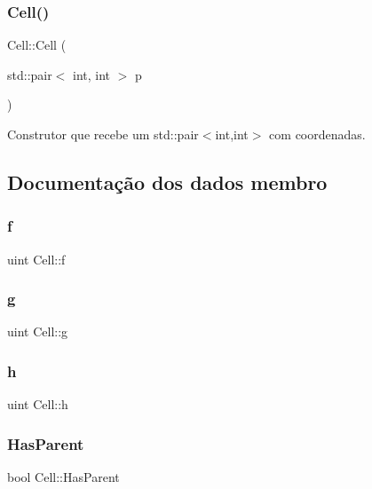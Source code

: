\subsubsection{\texorpdfstring{Cell()}{Cell()}\hspace{0.1cm}{\footnotesize\ttfamily [3/3]}}
{\footnotesize\ttfamily Cell\+::\+Cell (\begin{DoxyParamCaption}\item[{std\+::pair$<$ int, int $>$}]{p }\end{DoxyParamCaption})}



Construtor que recebe um std\+::pair$<$int,int$>$ com coordenadas. 



\subsection{Documentação dos dados membro}
\mbox{\label{structCell_ac55c1065864169fabe0172e0effa6091}} 
\subsubsection{\texorpdfstring{f}{f}}
{\footnotesize\ttfamily uint Cell\+::f}

\mbox{\label{structCell_acd60bf8f417807a2b1e5beaa1a8ddb3e}} 
\subsubsection{\texorpdfstring{g}{g}}
{\footnotesize\ttfamily uint Cell\+::g}

\mbox{\label{structCell_a0c169e75fb8f499906e2fb4b135444ba}} 
\subsubsection{\texorpdfstring{h}{h}}
{\footnotesize\ttfamily uint Cell\+::h}

\mbox{\label{structCell_ae352e96b13979220a2af863e2de1bcc7}} 
\subsubsection{\texorpdfstring{Has\+Parent}{HasParent}}
{\footnotesize\ttfamily bool Cell\+::\+Has\+Parent}

